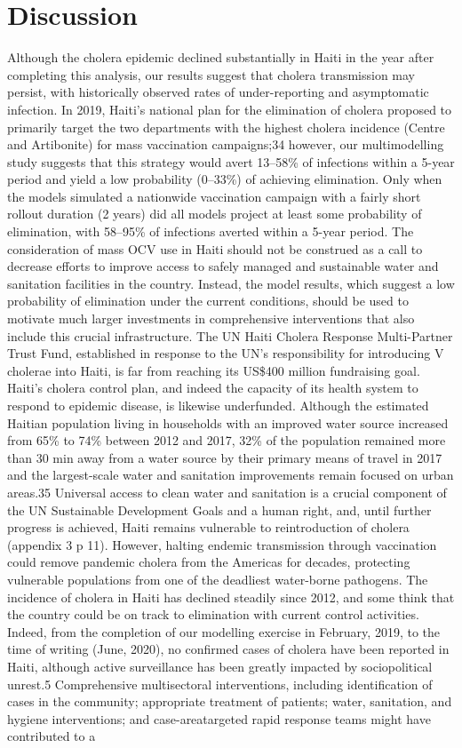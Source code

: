       \section{Discussion}
      Although the cholera epidemic declined substantially in Haiti in the year after completing this analysis, our results suggest that cholera transmission may persist, with historically observed rates of under-reporting and asymptomatic infection. In 2019, Haiti’s national plan for the elimination of cholera proposed to primarily target the two departments with the highest cholera incidence (Centre and Artibonite) for mass vaccination campaigns;34 however, our multimodelling study suggests that this strategy would avert 13–58\% of infections within a 5-year period and yield a low probability (0–33\%) of achieving elimination. Only when the models simulated a nationwide vaccination campaign with a fairly short rollout duration (2 years) did all models project at least some probability of elimination, with 58–95\% of infections averted within a 5-year period. The consideration of mass OCV use in Haiti should not be construed as a call to decrease efforts to improve access to safely managed and sustainable water and sanitation facilities in the country. Instead, the model results, which suggest a low probability of elimination under the current conditions, should be used to motivate much larger investments in comprehensive interventions that also include this crucial infrastructure. The UN Haiti Cholera Response Multi-Partner Trust Fund, established in response to the UN’s responsibility for introducing V cholerae into Haiti, is far from reaching its US\$400 million fundraising goal. Haiti’s cholera control plan, and indeed the capacity of its health system to respond to epidemic disease, is likewise underfunded. Although the estimated Haitian population living in households with an improved water source increased from 65\% to 74\% between 2012 and 2017, 32\% of the population remained more than 30 min away from a water source by their primary means of travel in 2017 and the largest-scale water and sanitation improvements remain focused on urban areas.35 Universal access to clean water and sanitation is a crucial component of the UN Sustainable Development Goals and a human right, and, until further progress is achieved, Haiti remains vulnerable to reintroduction of cholera (appendix 3 p 11). However, halting endemic transmission through vaccination could remove pandemic cholera from the Americas for decades, protecting vulnerable populations from one of the deadliest water-borne pathogens. The incidence of cholera in Haiti has declined steadily since 2012, and some think that the country could be on track to elimination with current control activities. Indeed, from the completion of our modelling exercise in February, 2019, to the time of writing (June, 2020), no confirmed cases of cholera have been reported in Haiti, although active surveillance has been greatly impacted by sociopolitical unrest.5 Comprehensive multisectoral interventions, including identification of cases in the community; appropriate treatment of patients; water, sanitation, and hygiene interventions; and case-areatargeted rapid response teams might have contributed to a 